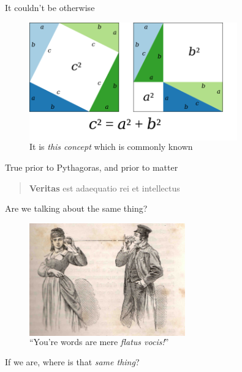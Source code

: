 \documentclass[xcolor=dvipsnames]{beamer}
\begin{document}
\begin{frame}{It couldn't be otherwise}
\begin{figure}
  \centering
  \begin{columns}
    \centering
    \caption {It is \emph{this concept} which is commonly known}
    \includegraphics[width=0.8\textwidth]{pythagoras_proof}
  \end{columns}
\end{figure}
True prior to Pythagoras, and prior to matter
\end{frame}




\begin{frame}[plain]
\begin{quote}
\centering
{\Large\textbf{Veritas} est adaequatio rei et intellectus}
\end{quote}
\end{frame}


\begin{frame}{Are we talking about the same thing?}
\begin{figure}
  \centering
  \begin{columns}
    \centering
    \caption {``You're words are mere \emph{flatus vocis!}''}
    \includegraphics[width=0.6\textwidth]{communication}
  \end{columns}
\end{figure}
If we are, where is that \emph{same thing}?
\end{frame}
\end{document}
